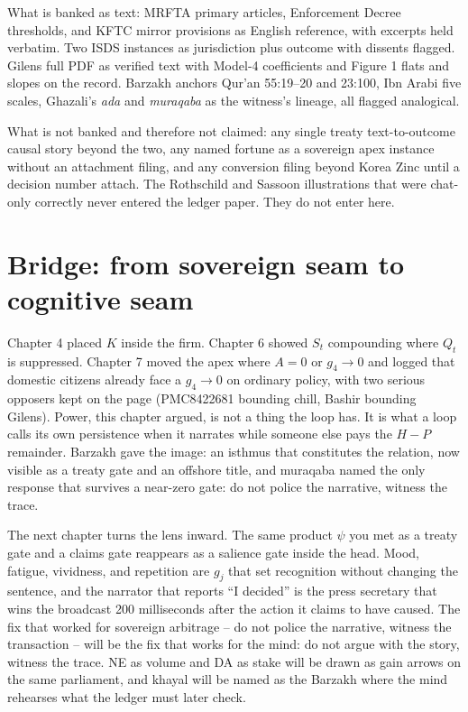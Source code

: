 What is banked as text: MRFTA primary articles, Enforcement Decree thresholds, and KFTC mirror provisions as English reference, with excerpts held verbatim. Two ISDS instances as jurisdiction plus outcome with dissents flagged. Gilens full PDF as verified text with Model-4 coefficients and Figure 1 flats and slopes on the record. Barzakh anchors Qur'an 55:19--20 and 23:100, Ibn Arabi five scales, Ghazali's \textit{ada} and \textit{muraqaba} as the witness's lineage, all flagged analogical.

What is not banked and therefore not claimed: any single treaty text-to-outcome causal story beyond the two, any named fortune as a sovereign apex instance without an attachment filing, and any conversion filing beyond Korea Zinc until a decision number attach. The Rothschild and Sassoon illustrations that were chat-only correctly never entered the ledger paper. They do not enter here.

\section{Bridge: from sovereign seam to cognitive seam}

Chapter 4 placed $K$ inside the firm. Chapter 6 showed $S_t$ compounding where $Q_t$ is suppressed. Chapter 7 moved the apex where $A=0$ or $g_4 \to 0$ and logged that domestic citizens already face a $g_4 \to 0$ on ordinary policy, with two serious opposers kept on the page (PMC8422681 bounding chill, Bashir bounding Gilens). Power, this chapter argued, is not a thing the loop has. It is what a loop calls its own persistence when it narrates while someone else pays the $H - P$ remainder. Barzakh gave the image: an isthmus that constitutes the relation, now visible as a treaty gate and an offshore title, and muraqaba named the only response that survives a near-zero gate: do not police the narrative, witness the trace.

The next chapter turns the lens inward. The same product $\psi$ you met as a treaty gate and a claims gate reappears as a salience gate inside the head. Mood, fatigue, vividness, and repetition are $g_j$ that set recognition without changing the sentence, and the narrator that reports ``I decided'' is the press secretary that wins the broadcast 200 milliseconds after the action it claims to have caused. The fix that worked for sovereign arbitrage -- do not police the narrative, witness the transaction -- will be the fix that works for the mind: do not argue with the story, witness the trace. NE as volume and DA as stake will be drawn as gain arrows on the same parliament, and khayal will be named as the Barzakh where the mind rehearses what the ledger must later check.
